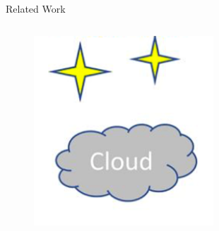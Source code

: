 \begin{frame}{Related Work}
\begin{overprint}
\begin{columns}
{\begin{column}{.26\textwidth}
\begin{centering}
\begin{figure}
                            \includegraphics[width=0.6\textwidth]{Images/Motivation/Cloud.png}
                        \end{figure}
                    \end{centering}
                \end{column}
                \vrule{}
            }
\end{columns}
\end{overprint}
\end{frame}
